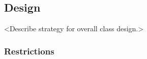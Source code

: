
\subsection{Design}

<Describe strategy for overall class design.>



\subsubsection{Restrictions}





